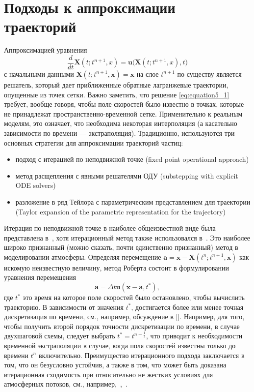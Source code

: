 \section*{Подходы к аппроксимации траекторий} \label{sect5_1}
Аппроксимацией уравнения
%
\begin{equation}
\label{eq:equation5_1}
\frac{d}{dt}\mathbf{X}(t;t^{n+1},x) = \mathbf{u}\Big(\mathbf{X}(t;t^{n+1}, x),t\Big)
\end{equation}
%
с начальными данными $\mathbf{X}(t;t^{n+1},\mathbf{x})=\mathbf{x}$ на слое $t^{n+1}$ по существу является решатель, который дает приближенные обратные лагранжевые траектории, опущенные из точек сетки. Важно заметить, что решение \eqref{eq:equation5_1} требует, вообще говоря, чтобы поле скоростей было известно в точках, которые не принадлежат пространственно-временной сетке. Применительно к реальным моделям, это означает, что необходима некоторая интерполяция (а касательно зависимости по времени --- экстраполяция). Традиционно, используются три основных стратегии для аппроксимации траекторий частиц:
\begin{itemize}
	\item подход с итерацией по неподвижной точке (fixed point operational approach)
	\item метод расщепления с явными решателями ОДУ (substepping with explicit ODE solvers)
	\item разложение в ряд Тейлора с параметрическим представлением для траектории (Taylor expansion of the parametric representation for the trajectory)
\end{itemize}
Итерация по неподвижной точке в наиболее общеизвестной виде была представлена в~\cite{A59}, хотя итерационный метод также использовался в~\cite{A36}. Это наиболее широко признанный (можно сказать, почти единственно признанный) метод в моделировании атмосферы. Определяя перемещение $\mathbf{a}=\mathbf{x} - \mathbf{X}(t^n;t^{n+1}, \mathbf{x})$ как искомую неизвестную величину, метод Роберта состоит в формулировании уравнения перемещения
%
\begin{equation}
\label{eq:equation5_2}
	\mathbf{a}=\Delta t \mathbf{u}(\mathbf{x} - \mathbf{a}, t^*),
\end{equation}
%
где $t^*$ это время на которое поле скоростей было остановлено, чтобы вычислить траекторию. В зависимости от значения $t^*$, достигается более или менее точная дискретизация по времени, см., например, обсуждение в []. Например, для того, чтобы получить второй порядок точности дискретизации по времени, в случае двухшаговой схемы, следует выбрать $t^*=t^{n+\frac{1}{2}}$, что приводит к необходимости временной экстраполяции в случае, когда поля скоростей известны только до времени $t^n$ включительно. Преимущество итерационного подхода заключается в том, что он безусловно устойчив, а также в том, что может быть доказана итерационная сходимость при относительно не жестких условиях для атмосферных потоков, см., например,~\cite{A52},~\cite{A65}.

